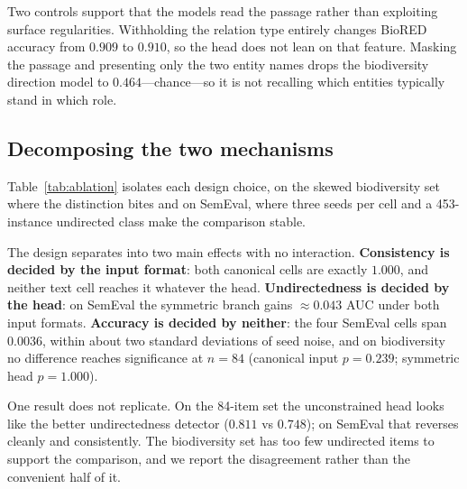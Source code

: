 \documentclass[11pt]{article}
\begin{document}
Two controls support that the models read the passage rather than exploiting surface
regularities. Withholding the relation type entirely changes BioRED accuracy from $0.909$ to
$0.910$, so the head does not lean on that feature. Masking the passage and presenting only the
two entity names drops the biodiversity direction model to $0.464$---chance---so it is not
recalling which entities typically stand in which role.

\subsection{Decomposing the two mechanisms}
\label{sec:res-ablation}
Table~\ref{tab:ablation} isolates each design choice, on the skewed biodiversity set where the
distinction bites and on SemEval, where three seeds per cell and a 453-instance undirected
class make the comparison stable.

The design separates into two main effects with no interaction. \textbf{Consistency is decided
by the input format}: both canonical cells are exactly $1.000$, and neither text cell reaches
it whatever the head. \textbf{Undirectedness is decided by the head}: on SemEval the symmetric
branch gains $\approx 0.043$ AUC under both input formats. \textbf{Accuracy is decided by
neither}: the four SemEval cells span $0.0036$, within about two standard deviations of seed
noise, and on biodiversity no difference reaches significance at $n=84$ (canonical input
$p=0.239$; symmetric head $p=1.000$).

One result does not replicate. On the 84-item set the unconstrained head looks like the better
undirectedness detector ($0.811$ vs $0.748$); on SemEval that reverses cleanly and
consistently. The biodiversity set has too few undirected items to support the comparison, and
we report the disagreement rather than the convenient half of it.
\end{document}
